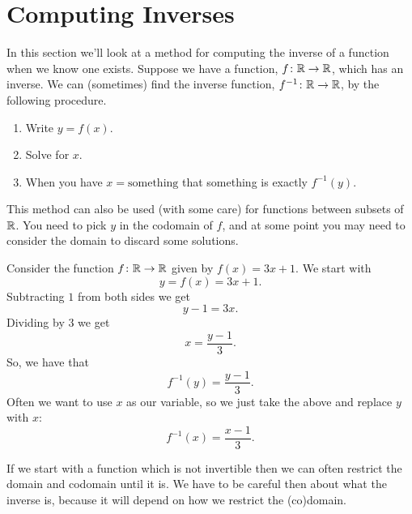 \documentclass[fleqn]{LectureClass/LectureClass}
\begin{document}
    \section{Computing Inverses}
    In this section we'll look at a method for computing the inverse of a function when we know one exists.
    Suppose we have a function, \(f \colon \mathbb{R} \to \mathbb{R}\), which has an inverse.
    We can (sometimes) find the inverse function, \(f^{-1} \colon \mathbb{R} \to \mathbb{R}\), by the following procedure.
    \begin{enumerate}
        \item Write \(y = f(x)\).
        \item Solve for \(x\).
        \item When you have \(x = \text{something}\) that something is exactly \(f^{-1}(y)\).
    \end{enumerate}
    This method can also be used (with some care) for functions between subsets of \(\mathbb{R}\).
    You need to pick \(y\) in the codomain of \(f\), and at some point you may need to consider the domain to discard some solutions.
    
    \begin{exm}{}{}
        Consider the function \(f \colon \mathbb{R} \to \mathbb{R}\) given by \(f(x) = 3x + 1\).
        We start with
        \begin{equation}
            y = f(x) = 3x + 1.
        \end{equation}
        Subtracting \(1\) from both sides we get
        \begin{equation}
            y - 1 = 3x.
        \end{equation}
        Dividing by \(3\) we get
        \begin{equation}
            x = \frac{y - 1}{3}.
        \end{equation}
        So, we have that
        \begin{equation}
            f^{-1}(y) = \frac{y - 1}{3}.
        \end{equation}
        Often we want to use \(x\) as our variable, so we just take the above and replace \(y\) with \(x\):
        \begin{equation}
            f^{-1}(x) = \frac{x - 1}{3}.
        \end{equation}
    \end{exm}
    
    If we start with a function which is not invertible then we can often restrict the domain and codomain until it is.
    We have to be careful then about what the inverse is, because it will depend on how we restrict the (co)domain.
    
\end{document}
